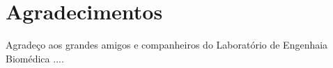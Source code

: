 

\chapter*{Agradecimentos}
Agradeço aos grandes amigos e companheiros do Laboratório de Engenhaia Biomédica ....
